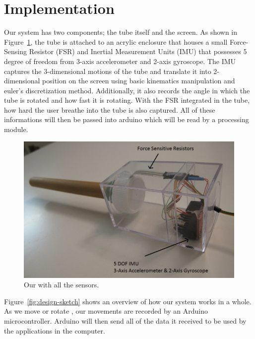 \section{Implementation}\label{sec:impl}

Our \tube system has two components; the tube itself and the screen. As shown in Figure~\ref{fig:impl1}, the tube is attached to an acrylic enclosure that houses a small Force-Sensing Resistor (FSR) and Inertial Measurement Units (IMU) that possesses 5 degree of freedom from 3-axis accelerometer and 2-axis gyroscope. The IMU captures the 3-dimensional motions of the tube and translate it into 2-dimensional position on the screen using basic kinematics manipulation and euler's discretization method. Additionally, it also records the angle in which the tube is rotated and how fast it is rotating. With the FSR integrated in the tube, how hard the user breathe into the tube is also captured. All of these informations will then be passed into arduino which will be read by a processing module.

\begin{figure}
  \centering
  \includegraphics[width=\linewidth]{./figs/impl1.png}
  \caption{Our \tube with all the sensors.}
  \label{fig:impl1}
\end{figure}

Figure~\ref{fig:design-sketch} shows an overview of how our \tube system works in a whole. As we move or rotate \tube, our movements are recorded by an Arduino microcontroller. Arduino will then send all of the data it received to be used by the applications in the computer.

